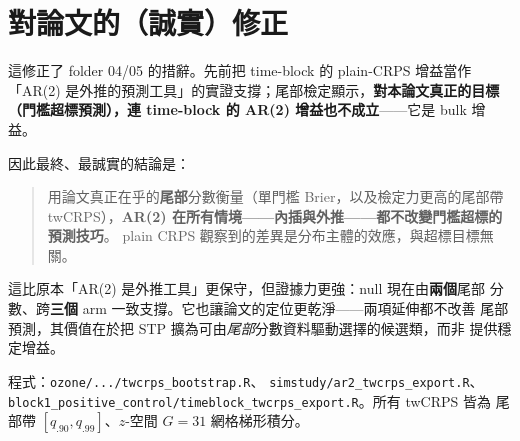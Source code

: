 \documentclass[12pt]{article}
\begin{document}
\section*{對論文的（誠實）修正}

這修正了 folder 04/05 的措辭。先前把 time-block 的 plain-CRPS 增益當作
「AR(2) 是外推的預測工具」的實證支撐；尾部檢定顯示，\textbf{對本論文真正的目標
（門檻超標預測），連 time-block 的 AR(2) 增益也不成立}——它是 bulk 增益。

因此最終、最誠實的結論是：

\begin{quote}
用論文真正在乎的\textbf{尾部}分數衡量（單門檻 Brier，以及檢定力更高的尾部帶
twCRPS），\textbf{AR(2) 在所有情境——內插與外推——都不改變門檻超標的預測技巧}。
plain CRPS 觀察到的差異是分布主體的效應，與超標目標無關。
\end{quote}

這比原本「AR(2) 是外推工具」更保守，但證據力更強：null 現在由\textbf{兩個}尾部
分數、跨\textbf{三個} arm 一致支撐。它也讓論文的定位更乾淨——兩項延伸都不改善
尾部預測，其價值在於把 STP 擴為可由\emph{尾部}分數資料驅動選擇的候選類，而非
提供穩定增益。

\medskip
\noindent\footnotesize 程式：\verb|ozone/.../twcrps_bootstrap.R|、
\verb|simstudy/ar2_twcrps_export.R|、
\verb|block1_positive_control/timeblock_twcrps_export.R|。所有 twCRPS 皆為
尾部帶 $[q_{.90},q_{.99}]$、$z$-空間 $G{=}31$ 網格梯形積分。
\end{document}
